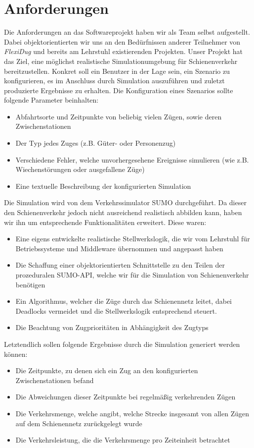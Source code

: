 \section{Anforderungen}
Die Anforderungen an das Softwareprojekt haben wir als Team selbst aufgestellt. Dabei objektorientierten wir uns an den Bedürfnissen anderer Teilnehmer von \emph{FlexiDug} und bereits am Lehrstuhl existierenden Projekten. Unser Projekt hat das Ziel, eine möglichst realistische Simulationumgebung für Schienenverkehr bereitzustellen. Konkret soll ein Benutzer in der Lage sein, ein Szenario zu konfigurieren, es im Anschluss durch Simulation auszuführen und zuletzt produzierte Ergebnisse zu erhalten. Die Konfiguration eines Szenarios sollte folgende Parameter beinhalten:
\begin{itemize}
    \item Abfahrtsorte und Zeitpunkte von beliebig vielen Zügen, sowie deren Zwischenstationen
    \item Der Typ jedes Zuges (z.B. Güter- oder Personenzug)
    \item Verschiedene Fehler, welche unvorhergesehene Ereignisse simulieren (wie z.B. Wiechenstörungen oder ausgefallene Züge)
    \item Eine textuelle Beschreibung der konfigurierten Simulation
\end{itemize}
Die Simulation wird von dem Verkehrssimulator SUMO \cite{noauthor_eclipse_nodate} durchgeführt. Da dieser den Schienenverkehr jedoch nicht ausreichend realistisch abbilden kann, haben wir ihn um entsprechende Funktionalitäten erweitert. Diese waren:
\begin{itemize}
    \item Eine eigens entwickelte realistische Stellwerkslogik, die wir vom Lehrstuhl für Betriebssysteme und Middleware übernommen und angepasst haben \cite{noauthor_interlocking_2023}
    \item Die Schaffung einer objektorientierten Schnittstelle zu den Teilen der prozeduralen SUMO-API, welche wir für die Simulation von Schienenverkehr benötigen
    \item Ein Algorithmus, welcher die Züge durch das Schienennetz leitet, dabei Deadlocks vermeidet und die Stellwerkslogik entsprechend steuert.
    \item Die Beachtung von Zugprioritäten in Abhängigkeit des Zugtyps
\end{itemize}
Letztendlich sollen folgende Ergebnisse durch die Simulation generiert werden können:
\begin{itemize}
    \item Die Zeitpunkte, zu denen sich ein Zug an den konfigurierten Zwischenstationen befand
    \item Die Abweichungen dieser Zeitpunkte bei regelmäßig verkehrenden Zügen
    \item Die Verkehrsmenge, welche angibt, welche Strecke insgesamt von allen Zügen auf dem Schienennetz zurückgelegt wurde
    \item Die Verkehrsleistung, die die Verkehrsmenge pro Zeiteinheit betrachtet
\end{itemize}

